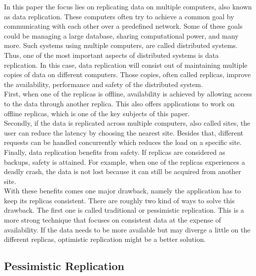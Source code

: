 \documentclass[a4paper,12pt]{report}
\begin{document}
In this paper the focus lies on replicating data on multiple computers, also known as data replication. These computers often try to achieve a common goal by communicating with each other over a predefined network. Some of these goals could be managing a large database, sharing computational power, and many more. Such systems using multiple computers, are called distributed systems.
Thus, one of the most important aspects of distributed systems is data replication. In this case, data replication will consist out of maintaining multiple copies of data on different computers. Those copies, often called replicas, improve the availability, performance and safety of the distributed system. \\
First, when one of the replicas is offline, availability is achieved by allowing access to the data through another replica. This also offers applications to work on offline replicas, which is one of the key subjects of this paper. \\
Secondly, if the data is replicated across multiple computers, also called sites, the user can reduce the latency by choosing the nearest site. Besides that, different requests can be handled concurrently which reduces the load on a specific site. \\
Finally, data replication benefits from safety. If replicas are considered as backups, safety is attained. For example, when one of the replicas experiences a deadly crash, the data is not lost because it can still be acquired from another site.\\
\newline
With these benefits comes one major drawback, namely the application has to keep its replicas consistent. There are roughly two kind of ways to solve this drawback. The first one is called traditional or pessimistic replication. This is a more strong technique that focuses on consistent data at the expense of availability. If the data needs to be more available but may diverge a little on the different replicas, optimistic replication might be a better solution.

\subsection{Pessimistic Replication}\label{sec:PessimisticReplication}
\end{document}
